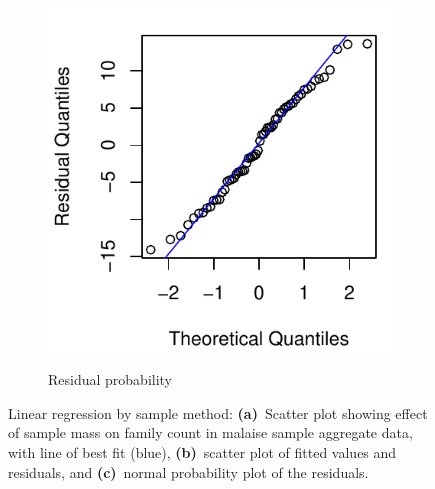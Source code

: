 \documentclass[10pt,letterpaper,twocolumn]{article}
\begin{document}
\begin{figure}[h]
\begin{subfigure}[b]{0.15\textwidth}
		\label{fig:bulk_malaise_resid}
	\end{subfigure}
	~
	\begin{subfigure}[b]{0.15\textwidth}
		\caption{Residual probability}
		\includegraphics[width=\textwidth]{plots//bulk/2015_bulk_malaise_qqplot.pdf}
		\label{fig:bulk_malaise_qqplot}
	\end{subfigure}
	\caption{Linear regression by sample method: \textbf{(a)}~Scatter plot showing effect of sample mass on family count in malaise sample aggregate data, with line of best fit (blue), \textbf{(b)}~scatter plot of fitted values and residuals, and \textbf{(c)}~normal probability plot of the residuals.}
	\label{fig:bulk_malaise_mass_vs_family}
	\smallskip
	\nointerlineskip
	\hrulefill
\end{figure}
\end{document}
